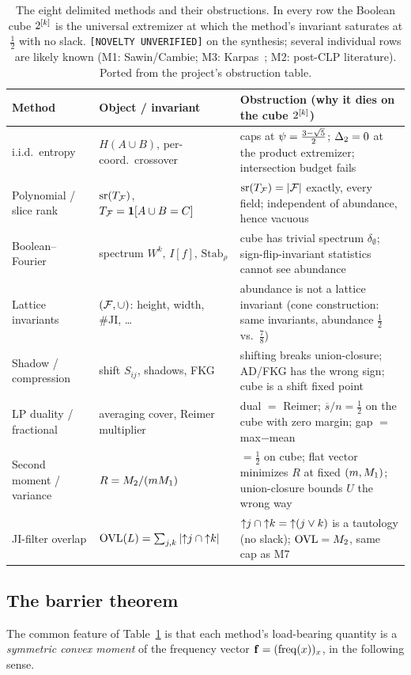 \documentclass[11pt]{amsart}
\theoremstyle{definition}
\theoremstyle{remark}
\begin{document}
\begin{table}[t]
\centering
\small
\begin{tabular}{@{}p{2.9cm}p{3.1cm}p{6.6cm}@{}}
\toprule
Method & Object / invariant & Obstruction (why it dies on the cube $2^{[k]}$) \\
\midrule
i.i.d.\ entropy & $H(A\cup B)$, per-coord.\ crossover & caps at $\psi=\tfrac{3-\sqrt{5}}{2}$;
$\Delta_2=0$ at the product extremizer; intersection budget fails \\[2pt]
Polynomial / slice rank & $\operatorname{sr}(T_{\mathcal{F}})$, $T_{\mathcal{F}}=\mathbf 1[A\cup B=C]$ &
$\operatorname{sr}(T_{\mathcal{F}})=|\mathcal{F}|$ exactly, every field; independent of abundance,
hence vacuous \\[2pt]
Boolean--Fourier & spectrum $W^k,\,I[f],\,\mathrm{Stab}_\rho$ & cube has trivial
spectrum $\delta_\emptyset$; sign-flip-invariant statistics cannot see abundance \\[2pt]
Lattice invariants & $(\mathcal{F},\cup)$: height, width, \#JI, \dots & abundance is not a
lattice invariant (cone construction: same invariants, abundance $\tfrac12$ vs.\
$\tfrac78$) \\[2pt]
Shadow / compression & shift $S_{ij}$, shadows, FKG & shifting breaks
union-closure; AD/FKG has the wrong sign; cube is a shift fixed point \\[2pt]
LP duality / fractional & averaging cover, Reimer multiplier & dual $=$ Reimer;
$\overline s/n=\tfrac12$ on the cube with zero margin; gap $=$ max$-$mean \\[2pt]
Second moment / variance & $R=M_2/(mM_1)$ & $=\tfrac12$ on cube; flat vector
minimizes $R$ at fixed $(m,M_1)$; union-closure bounds $U$ the wrong way \\[2pt]
JI-filter overlap & $\mathrm{OVL}(L)=\sum_{j,k}|{\uparrow}j\cap{\uparrow}k|$ &
${\uparrow}j\cap{\uparrow}k={\uparrow}(j\vee k)$ is a tautology (no slack); $\mathrm{OVL}=M_2$,
same cap as M7 \\
\bottomrule
\end{tabular}
\caption{The eight delimited methods and their obstructions. In every row the
Boolean cube $2^{[k]}$ is the universal extremizer at which the method's invariant
saturates at $\tfrac12$ with no slack. \texttt{[NOVELTY UNVERIFIED]} on the
synthesis; several individual rows are likely known (M1: Sawin/Cambie; M3:
Karpas~\cite{karpas2017}; M2: post-CLP literature). Ported from the project's
obstruction table.}
\label{tab:barrier}
\end{table}

\subsection{The barrier theorem}\label{ssec:barrier-thm}
The common feature of Table~\ref{tab:barrier} is that each method's load-bearing
quantity is a \emph{symmetric convex moment} of the frequency vector
$\mathbf f=(\mathrm{freq}(x))_x$, in the following sense.
\end{document}
